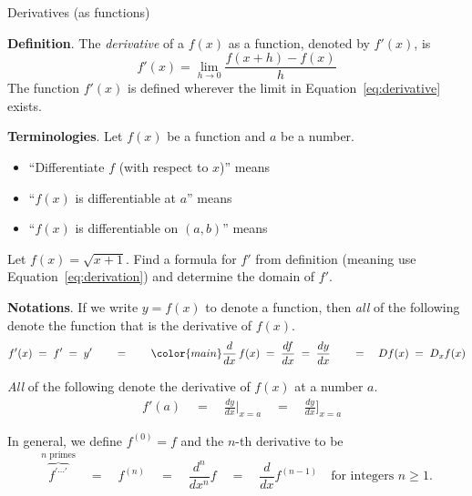 \documentclass[../main.tex]{subfiles}
\begin{document}
\begin{lesson}{Derivatives (as functions)}

\begin{mdframed}[style=withref]
  \textbf{Definition}. The \emph{derivative} of a \(f(x)\) as a function, denoted by \(f'(x)\), is
  \begin{equation} \label{eq:derivative}
    f'(x) = {\lim_{h \to 0} \frac{f(x+h) - f(x)}{h}}
  \end{equation}
  The function \(f'(x)\) is defined wherever the limit in Equation~\eqref{eq:derivative} exists.

\end{mdframed}
\textbf{Terminologies}. Let \(f(x)\) be a function and \(a\) be a number.
\begin{itemize}
  \item ``Differentiate \(f\) (with respect to \(x\))'' means \underline{\hspace{3in}}
  \item ``\(f(x)\) is differentiable at \(a\)'' means \underline{\hspace{3.62in}}
  \item ``\(f(x)\) is differentiable on \((a,b)\)'' means \underline{\hspace{3.36in}}
\end{itemize}

\bigskip
\begin{example}
  Let \(f(x) = \sqrt{x + 1}\). Find a formula for \(f'\) from definition (meaning use Equation~\eqref{eq:derivation}) and determine the domain of \(f'\).

\end{example}

\clearpage

\textbf{Notations}. If we write \(y = f(x)\) to denote a function, then \emph{all} of the following denote the function that is the derivative of \(f(x)\).
\[
  f'(x) 
  \;=\; f' 
  \;=\; y' 
  \qquad =\qquad  
  {\color{main} \frac{d}{dx}} \, f(x) \;=\; \frac{df}{dx} \;=\; \frac{dy}{dx}
  \qquad=\quad 
  Df(x) 
  \;=\; D_{x} f(x)
\]

\emph{All} of the following denote the derivative of \(f(x)\) at a number \(a\).
\begin{align*}
  & f'(a) \quad=\quad \frac{dy}{dx} \bigg|_{x = a} \quad=\quad \frac{dy}{dx} \bigg]_{x = a}
\end{align*}

\label{page:higher-derivatives}
In general, we define \(f^{(0)} = f\) and the \(n\)-th derivative to be
\[
  \overbrace{f^{' \cdots '}}^{\text{\(n\) primes}} \quad=\quad f^{(n)} \quad=\quad \frac{d^{n}}{dx^{n}} f \quad=\quad \frac{d}{dx} f^{(n-1)} \quad\text{for integers } n \ge 1.
\]


\end{lesson}
\end{document}
